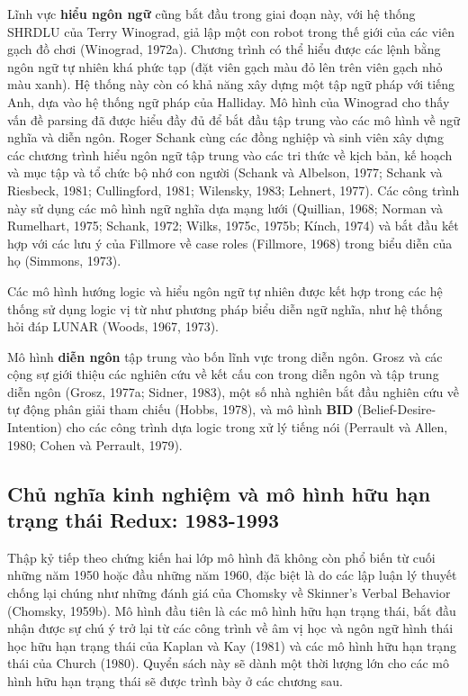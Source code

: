 Lĩnh vực \textbf{hiểu ngôn ngữ} cũng bắt đầu trong giai đoạn này, với hệ thống SHRDLU của Terry Winograd, giả lập một con robot trong thế giới của các viên gạch đồ chơi (Winograd, 1972a). Chương trình có thể hiểu được các lệnh bằng ngôn ngữ tự nhiên khá phức tạp (đặt viên gạch màu đỏ lên trên viên gạch nhỏ màu xanh). Hệ thống này còn có khả năng xây dựng một tập ngữ pháp với tiếng Anh, dựa vào hệ thống ngữ pháp của Halliday. Mô hình của Winograd cho thấy vấn đề parsing đã được hiểu đầy đủ để bắt đầu tập trung vào các mô hình về ngữ nghĩa và diễn ngôn. Roger Schank cùng các đồng nghiệp và sinh viên xây dựng các chương trình hiểu ngôn ngữ tập trung vào các tri thức về kịch bản, kế hoạch và mục tập và tổ chức bộ nhớ con người (Schank và Albelson, 1977; Schank và Riesbeck, 1981; Cullingford, 1981; Wilensky, 1983; Lehnert, 1977). Các công trình này sử dụng các mô hình ngữ nghĩa dựa mạng lưới (Quillian, 1968; Norman và Rumelhart, 1975; Schank, 1972; Wilks, 1975c, 1975b; Kínch, 1974) và bắt đầu kết hợp với các lưu ý của Fillmore về case roles (Fillmore, 1968) trong biểu diễn của họ (Simmons, 1973).

Các mô hình hướng logic và hiểu ngôn ngữ tự nhiên được kết hợp trong các hệ thống sử dụng logic vị từ như phương pháp biểu diễn ngữ nghĩa, như hệ thống hỏi đáp LUNAR (Woods, 1967, 1973).

Mô hình \textbf{diễn ngôn} tập trung vào bốn lĩnh vực trong diễn ngôn. Grosz và các cộng sự giới thiệu các nghiên cứu về kết cấu con trong diễn ngôn và tập trung diễn ngôn (Grosz, 1977a; Sidner, 1983), một số nhà nghiên bắt đầu nghiên cứu về tự động phân giải tham chiếu (Hobbs, 1978), và mô hình \textbf{BID} (Belief-Desire-Intention) cho các công trình dựa logic trong xử lý tiếng nói (Perrault và Allen, 1980; Cohen và Perrault, 1979).

\subsection{Chủ nghĩa kinh nghiệm và mô hình hữu hạn trạng thái Redux: 1983-1993}

Thập kỷ tiếp theo chứng kiến hai lớp mô hình đã không còn phổ biến từ cuối những năm 1950 hoặc đầu những năm 1960, đặc biệt là do các lập luận lý thuyết chống lại chúng như những đánh giá của Chomsky về Skinner's Verbal Behavior (Chomsky, 1959b). Mô hình đầu tiên là các mô hình hữu hạn trạng thái, bắt đầu nhận được sự chú ý trở lại từ các công trình về âm vị học và ngôn ngữ hình thái học hữu hạn trạng thái của Kaplan và Kay (1981) và các mô hình hữu hạn trạng thái của Church (1980). Quyển sách này sẽ dành một thời lượng lớn cho các mô hình hữu hạn trạng thái sẽ được trình bày ở các chương sau.

